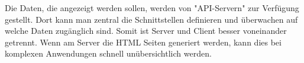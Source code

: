 Die Daten, die angezeigt werden sollen, werden von "API-Servern" zur Verfügung gestellt. Dort kann man zentral die Schnittstellen definieren und überwachen auf welche Daten zugänglich sind. Somit ist Server und Client besser voneinander getrennt. Wenn am Server die HTML Seiten generiert werden, kann dies bei komplexen Anwendungen schnell unübersichtlich werden.

